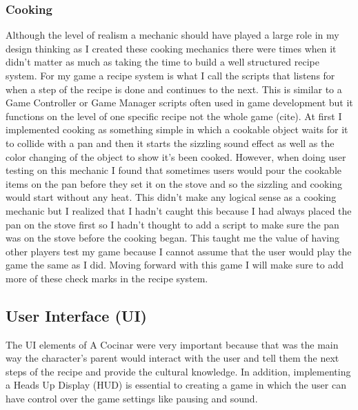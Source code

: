 \documentclass[10pt,twocolumn]{article}
\begin{document}
\subsubsection{Cooking}
Although the level of realism a mechanic should have played a large role in my design thinking as I created these cooking mechanics there were times when it didn’t matter as much as taking the time to build a well structured recipe system. For my game a recipe system is what I call the scripts that listens for when a step of the recipe is done and continues to the next. This is similar to a Game Controller or Game Manager scripts often used in game development but it functions on the level of one specific recipe not the whole game (cite). At first I implemented cooking as something simple in which a cookable object waits for it to collide with a pan and then it starts the sizzling sound effect as well as the color changing of the object to show it’s been cooked. However, when doing user testing on this mechanic I found that sometimes users would pour the cookable items on the pan before they set it on the stove and so the sizzling and cooking would start without any heat. This didn’t make any logical sense as a cooking mechanic but I realized that I hadn’t caught this because I had always placed the pan on the stove first so I hadn’t thought to add a script to make sure the pan was on the stove before the cooking began. This taught me the value of having other players test my game because I cannot assume that the user would play the game the same as I did. Moving forward with this game I will make sure to add more of these check marks in the recipe system. 

\subsection{User Interface (UI)}
The UI elements of A Cocinar were very important because that was the main way the character’s parent would interact with the user and tell them the next steps of the recipe and provide the cultural knowledge. In addition, implementing a Heads Up Display (HUD) is essential to creating a game in which the user can have control over the game settings like pausing and sound.  
\end{document}
